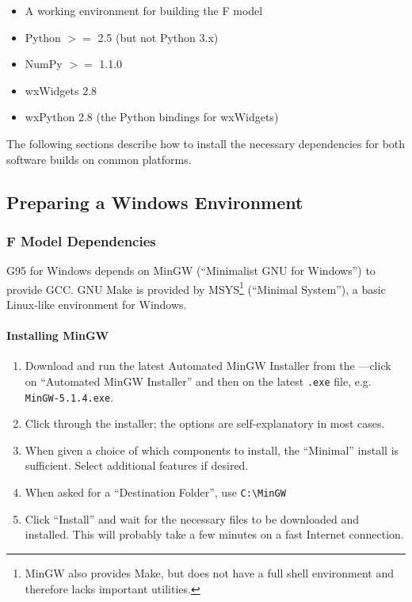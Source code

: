 \begin{itemize}
\item A working environment for building the F model
\item Python $>=$ 2.5 (but not Python 3.x)
\item NumPy $>=$ 1.1.0
\item wxWidgets 2.8
\item wxPython 2.8 (the Python bindings for wxWidgets)
\end{itemize}

The following sections describe how to install the necessary dependencies for both software builds 
on common platforms.


\subsection{Preparing a Windows Environment}
\label{dev:env:windows}

\subsubsection{F Model Dependencies}

G95 for Windows depends on MinGW (``Minimalist GNU for Windows'') to provide GCC.  GNU Make is 
provided by MSYS\footnote{MinGW also provides Make, but does not have a full shell environment and 
therefore lacks important utilities.} (``Minimal System''), a basic Linux-like environment for 
Windows. 

\paragraph{Installing MinGW}

\begin{enumerate}

\item Download and run the latest Automated MinGW Installer from the 
---click on ``Automated 
MinGW Installer'' and then on the latest \verb|.exe| file, e.g. \verb|MinGW-5.1.4.exe|.

\item Click through the installer; the options are self-explanatory in most cases.

\item When given a choice of which components to install, the ``Minimal'' install is sufficient.  
Select additional features if desired.

\item When asked for a ``Destination Folder'', use \verb|C:\MinGW|

\item Click ``Install'' and wait for the necessary files to be downloaded and installed.  This will 
probably take a few minutes on a fast Internet connection.

\end{enumerate}

